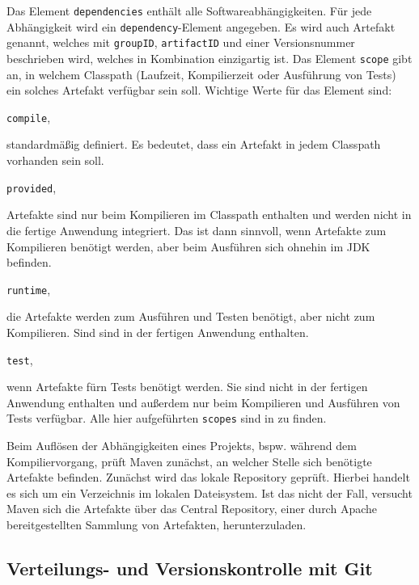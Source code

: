 Das Element \texttt{dependencies} enthält alle Softwareabhängigkeiten. Für jede Abhängigkeit wird ein \texttt{dependency}-Element angegeben. Es wird auch Artefakt genannt, welches mit \texttt{groupID}, \texttt{artifactID} und einer Versionsnummer beschrieben wird, welches in Kombination einzigartig ist.
Das Element \texttt{scope} gibt an, in welchem Classpath (Laufzeit, Kompilierzeit oder Ausführung von Tests) ein solches Artefakt verfügbar sein soll. Wichtige Werte für das Element sind:

\texttt{compile},

standardmäßig definiert. Es bedeutet, dass ein Artefakt in jedem Classpath vorhanden sein soll.

\texttt{provided},

Artefakte sind nur beim Kompilieren im Classpath enthalten und werden nicht in die fertige Anwendung integriert. Das ist dann sinnvoll, wenn Artefakte zum Kompilieren benötigt werden, aber beim Ausführen sich ohnehin im JDK befinden.

\texttt{runtime},

die Artefakte werden zum Ausführen und Testen benötigt, aber nicht zum Kompilieren. Sind sind in der fertigen Anwendung enthalten.

\texttt{test},

wenn Artefakte fürn Tests benötigt werden. Sie sind nicht in der fertigen Anwendung enthalten und außerdem nur beim Kompilieren und Ausführen von Tests verfügbar.
Alle hier aufgeführten \texttt{scopes} sind in \cite{MVNintrodep} zu finden. 

	

Beim Auflösen der Abhängigkeiten eines Projekts, bspw. während dem Kompiliervorgang, prüft Maven zunächst, an welcher Stelle sich benötigte Artefakte befinden. Zunächst wird das lokale Repository geprüft. Hierbei handelt es sich um ein Verzeichnis im lokalen Dateisystem.
Ist das nicht der Fall, versucht Maven sich die Artefakte über das Central Repository, einer durch Apache bereitgestellten Sammlung von Artefakten, herunterzuladen. 

\subsection{Verteilungs- und Versionskontrolle mit Git}

